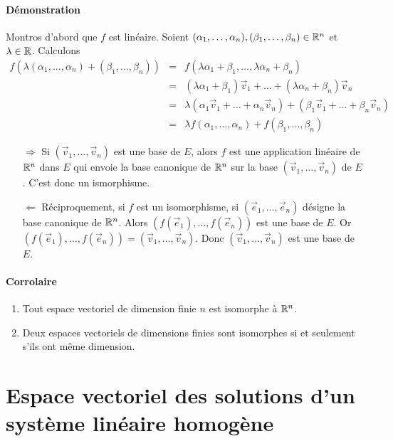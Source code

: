 \paragraph{Démonstration} 
Montros d'abord que $f$ est linéaire. Soient $(\alpha_1, \ldots, \alpha_n), (\beta_1, \ldots, \beta_n) \in \mathbb{R}^n$ et $ \lambda \in \mathbb{R}$. Calculons
\begin{eqnarray*}
  f(\lambda (\alpha_1, \ldots, \alpha_n) + (\beta_1, \ldots, \beta_n))
    &=& f( \lambda \alpha_1 + \beta_1, \ldots, \lambda \alpha_n + \beta_n) \\
    &=& (\lambda \alpha_1 + \beta_1) \vec{v}_1 + \ldots + (\lambda \alpha_n + \beta_n) \vec{v}_n \\
    &=& \lambda (\alpha_1 \vec{v}_1 + \ldots + \alpha_n \vec{v}_n) + (\beta_1 \vec{v}_1 + \ldots + \beta_n \vec{v}_n) \\
    &=& \lambda f(\alpha_1, \ldots, \alpha_n) + f(\beta_1, \ldots, \beta_n)
\end{eqnarray*}
\begin{itemize}
  \item[$\Rightarrow$] Si $(\vec{v}_1, \ldots, \vec{v}_n)$ est une base de $E$, alors $f$ est une application linéaire de $\mathbb{R}^n$ dans $E$ qui envoie la base canonique de $\mathbb{R}^n$ sur la base $(\vec{v}_1, \ldots, \vec{v}_n)$ de $E$. C'est donc un ismorphisme.
  
  \item[$\Leftarrow$] Réciproquement, si $f$ est un isomorphisme, si $(\vec{e}_1, \ldots, \vec{e}_n)$ désigne la base canonique de $\mathbb{R}^n$. Alors $(f(\vec{e}_1), \ldots, f(\vec{e}_n))$ est une base de $E$. Or $(f(\vec{e}_1), \ldots, f(\vec{e}_n)) = (\vec{v}_1, \ldots, \vec{v}_n)$. Donc $(\vec{v}_1, \ldots, \vec{v}_n)$ est une base de $E$.
\end{itemize}

\paragraph{Corrolaire}
\begin{enumerate}
  \item Tout espace vectoriel de dimension finie $n$ est isomorphe à $\mathbb{R}^n$.
  \item Deux espaces vectoriels de dimensions finies sont isomorphes si et seulement s'ils ont même dimension.
\end{enumerate}

%
%
\section{Espace vectoriel des solutions d'un système linéaire homogène}
%
%
